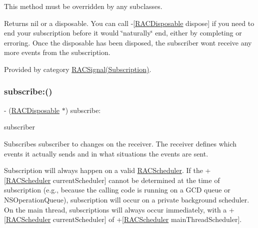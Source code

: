 This method must be overridden by any subclasses.

Returns nil or a disposable. You can call -\/\mbox{[}\mbox{\hyperlink{interface_r_a_c_disposable}{R\+A\+C\+Disposable}} dispose\mbox{]} if you need to end your subscription before it would \char`\"{}naturally\char`\"{} end, either by completing or erroring. Once the disposable has been disposed, the subscriber won\textquotesingle{}t receive any more events from the subscription. 

Provided by category \mbox{\hyperlink{category_r_a_c_signal_07_subscription_08_aeab76d632d98bbc321ec5e19575377eb}{R\+A\+C\+Signal(\+Subscription)}}.

\mbox{\label{interface_r_a_c_signal_aeab76d632d98bbc321ec5e19575377eb}} 
\subsubsection{\texorpdfstring{subscribe\+:()}{subscribe:()}\hspace{0.1cm}{\footnotesize\ttfamily [2/3]}}
{\footnotesize\ttfamily -\/ (\mbox{\hyperlink{interface_r_a_c_disposable}{R\+A\+C\+Disposable}} $\ast$) subscribe\+: \begin{DoxyParamCaption}\item[{(id$<$\mbox{\hyperlink{interface_r_a_c_subscriber}{R\+A\+C\+Subscriber}}$>$)}]{subscriber }\end{DoxyParamCaption}}

Subscribes {\ttfamily subscriber} to changes on the receiver. The receiver defines which events it actually sends and in what situations the events are sent.

Subscription will always happen on a valid \mbox{\hyperlink{interface_r_a_c_scheduler}{R\+A\+C\+Scheduler}}. If the +\mbox{[}\mbox{\hyperlink{interface_r_a_c_scheduler}{R\+A\+C\+Scheduler}} current\+Scheduler\mbox{]} cannot be determined at the time of subscription (e.\+g., because the calling code is running on a G\+CD queue or N\+S\+Operation\+Queue), subscription will occur on a private background scheduler. On the main thread, subscriptions will always occur immediately, with a +\mbox{[}\mbox{\hyperlink{interface_r_a_c_scheduler}{R\+A\+C\+Scheduler}} current\+Scheduler\mbox{]} of +\mbox{[}\mbox{\hyperlink{interface_r_a_c_scheduler}{R\+A\+C\+Scheduler}} main\+Thread\+Scheduler\mbox{]}.

